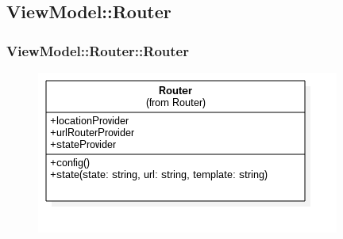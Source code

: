 \subsection{ViewModel::Router}
\subsubsection{ViewModel::Router::Router}
\begin{figure}[h!]
\begin{center}
	\includegraphics[scale=0.4]{../images/ViewModel/Router/Router.png}
\end{center}
\end{figure}
